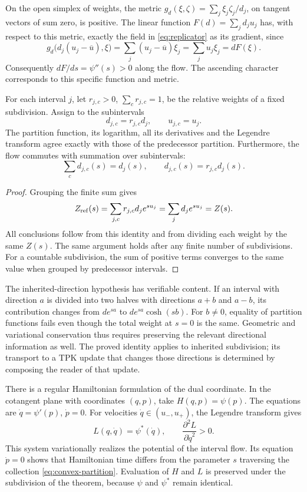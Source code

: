 On the open simplex of weights, the metric
\(g_d(\xi,\zeta)=\sum_j\xi_j\zeta_j/d_j\), on tangent vectors
of sum zero, is positive. The linear function
\(F(d)=\sum_jd_ju_j\) has, with respect to this metric, exactly the
field in \eqref{eq:replicator} as its gradient, since
\[
 g_d\bigl(d_j(u_j-\overline u),\xi\bigr)
 =\sum_j(u_j-\overline u)\xi_j=\sum_ju_j\xi_j=dF(\xi).
\]
Consequently \(dF/ds=\psi''(s)>0\) along the flow. The
ascending character corresponds to this specific function and metric.

\begin{theorem}
For each interval \(j\), let \(r_{j,c}>0\),
\(\sum_c r_{j,c}=1\), be the relative weights of a fixed subdivision.
Assign to the subintervals
\[
 d_{j,c}=r_{j,c}d_j,\qquad u_{j,c}=u_j.
\]
The partition function, its logarithm, all its derivatives and the Legendre
transform agree exactly with those of the predecessor partition.
Furthermore, the flow commutes with summation over subintervals:
\[
 \sum_c d_{j,c}(s)=d_j(s),\qquad
 d_{j,c}(s)=r_{j,c}d_j(s).
\]
\end{theorem}
\begin{proof}
Grouping the finite sum gives
\[
 Z_{\rm ref}(s)=\sum_{j,c}r_{j,c}d_j e^{su_j}
 =\sum_j d_j e^{su_j}=Z(s).
\]
All conclusions follow from this identity and from dividing each
weight by the same \(Z(s)\). The same argument holds after any
finite number of subdivisions. For a countable subdivision, the sum of
positive terms converges to the same value when grouped by predecessor intervals.
\end{proof}

The inherited-direction hypothesis has verifiable content. If an
interval with direction \(a\) is divided into two halves with directions
\(a+b\) and \(a-b\), its contribution changes from
\(d e^{sa}\) to \(d e^{sa}\cosh(sb)\). For \(b\ne0\), equality
of partition functions fails even though the total weight at \(s=0\) is
the same. Geometric and variational conservation thus requires preserving
the relevant directional information as well. The proved identity
applies to inherited subdivision; its transport to a TPK update
that changes those directions is determined by composing the reader of that
update.

There is a regular Hamiltonian formulation of the dual coordinate. In the
cotangent plane with coordinates \((q,p)\), take
\(H(q,p)=\psi(p)\). The equations are
\(\dot q=\psi'(p)\), \(\dot p=0\). For velocities
\(\dot q\in(u_-,u_+)\), the Legendre transform gives
\[
 L(q,\dot q)=\psi^*(\dot q),\qquad
 \frac{\partial^2L}{\partial\dot q^2}>0.
\]
This system variationally realizes the potential of the interval flow.
Its equation \(\dot p=0\) shows that Hamiltonian time differs
from the parameter \(s\) traversing the collection \eqref{eq:convex-partition}.
Evaluation of \(H\) and \(L\) is preserved under the subdivision of the
theorem, because \(\psi\) and \(\psi^*\) remain identical.

